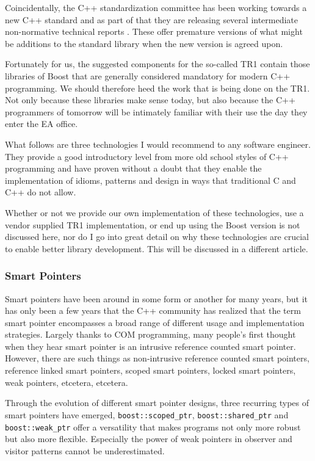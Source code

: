 \documentclass[twocolumn]{paper}
\begin{document}
Coincidentally, the C++ standardization committee has been working
towards a new C++ standard and as part of that they are releasing
several intermediate non-normative technical reports \cite{bib:tr1}.
These offer premature versions of what might be additions to the
standard library when the new version is agreed upon.

Fortunately for us, the suggested components for the so-called TR1
contain those libraries of Boost that are generally considered
mandatory for modern C++ programming. We should therefore heed the
work that is being done on the TR1. Not only because these libraries
make sense today, but also because the C++ programmers of tomorrow
will be intimately familiar with their use the day they enter the EA
office.

What follows are three technologies I would recommend to any
software engineer. They provide a good introductory level from more
old school styles of C++ programming and have proven without a doubt
that they enable the implementation of idioms, patterns and design
in ways that traditional C and C++ do not allow.

Whether or not we provide our own implementation of these
technologies, use a vendor supplied TR1 implementation, or end up
using the Boost version is not discussed here, nor do I go into
great detail on why these technologies are crucial to enable better
library development. This will be discussed in a different article.

\subsubsection{Smart Pointers}

Smart pointers have been around in some form or another for many
years, but it has only been a few years that the C++ community has
realized that the term smart pointer encompasses a broad range of
different usage and implementation strategies. Largely thanks to COM
programming, many people's first thought when they hear smart
pointer is an intrusive reference counted smart pointer. However,
there are such things as non-intrusive reference counted smart
pointers, reference linked smart pointers, scoped smart pointers,
locked smart pointers, weak pointers, etcetera, etcetera.

Through the evolution of different smart pointer designs, three
recurring types of smart pointers have emerged,
\texttt{boost::scoped\_ptr}, \texttt{boost::shared\_ptr} and
\texttt{boost::weak\_ptr} offer a versatility that makes programs
not only more robust but also more flexible. Especially the power of
weak pointers in observer and visitor patterns cannot be
underestimated.
\end{document}
